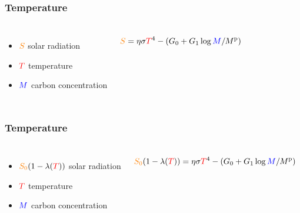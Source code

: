 \documentclass[pdf]{beamer}
\begin{document}
\begin{frame} \frametitle{Temperature}
    \begin{columns}
        \begin{itemize}
            \item ${\color{orange} S}$ solar radiation
            \item ${\color{red} T}$ temperature
            \item ${\color{blue} M}$ carbon concentration
        \end{itemize}
        \begin{equation*}
            {\color{orange} S} = \eta \sigma {\color{red} T}^4 - (G_0 + G_1 \log {\color{blue} M} / M^{\mathrm{p}})
        \end{equation*}
    \end{columns}
\end{frame}

\begin{frame} \frametitle{Temperature}
    \begin{columns}
        \begin{itemize}
            \item ${\color{orange} S_0} (1 - \lambda({\color{red} T}))$ solar radiation
            \item ${\color{red} T}$ temperature
            \item ${\color{blue} M}$ carbon concentration
        \end{itemize}
        \begin{equation*}
            {\color{orange} S_0} (1 - \lambda({\color{red} T})) = \eta \sigma {\color{red} T}^4 - (G_0 + G_1 \log {\color{blue} M} / M^{\mathrm{p}})
        \end{equation*}
    \end{columns}
\end{frame}
\end{document}
